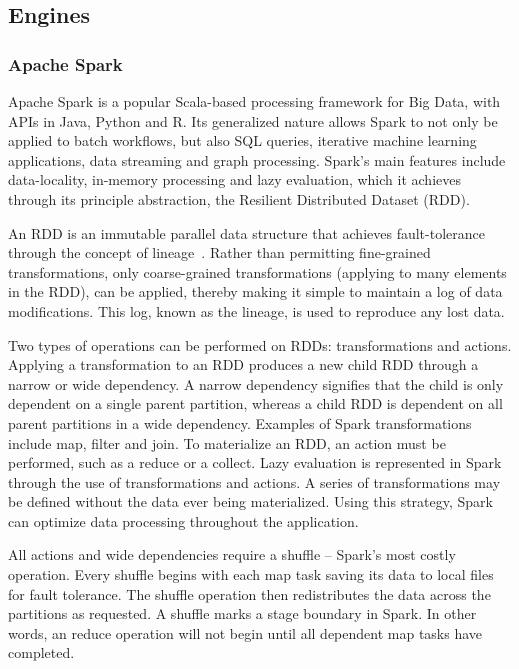 \documentclass{IEEEtran}
\begin{document}
\subsection{Engines} %

\subsubsection{Apache Spark}

Apache Spark is a popular Scala-based processing framework for Big Data, with
APIs in Java, Python and R. Its 
generalized nature allows Spark to not only be applied to batch workflows,
but also SQL queries, iterative machine learning applications, 
data streaming and graph processing. Spark's
main features include data-locality, in-memory processing and lazy evaluation,
which it achieves through its principle abstraction, the Resilient Distributed 
Dataset (RDD). 

An RDD is an immutable parallel data structure that achieves fault-tolerance 
through the concept of lineage~\cite{zaharia2010spark}. Rather than permitting
fine-grained transformations, only coarse-grained transformations (applying to
many elements in the RDD), can be applied, thereby making it simple to maintain a 
log of data modifications. This log, known as the lineage, is used
to reproduce any lost data.

Two types of operations can be performed on RDDs:
transformations and actions. Applying a transformation to an RDD produces a new
child RDD through a narrow or wide dependency. A narrow dependency signifies 
that the child is only dependent on a single parent partition, whereas a child 
RDD is dependent on all parent partitions in a wide dependency. Examples of 
Spark transformations include map, filter and join. To materialize an RDD, an
action must be performed, such as a reduce or a collect. Lazy evaluation is 
represented in Spark through the use of transformations and actions. A series of
transformations may be defined without the data ever being materialized. Using 
this strategy, Spark can optimize data processing
throughout the application.

All actions and wide dependencies require a shuffle -- Spark's most costly
operation. Every shuffle begins with each map task saving its data to local
files for fault tolerance. The shuffle operation then 
redistributes the data across the partitions as requested. A shuffle marks a 
stage boundary in Spark. In other words, an reduce operation  will not begin 
until all 
dependent map tasks have completed.
\end{document}
